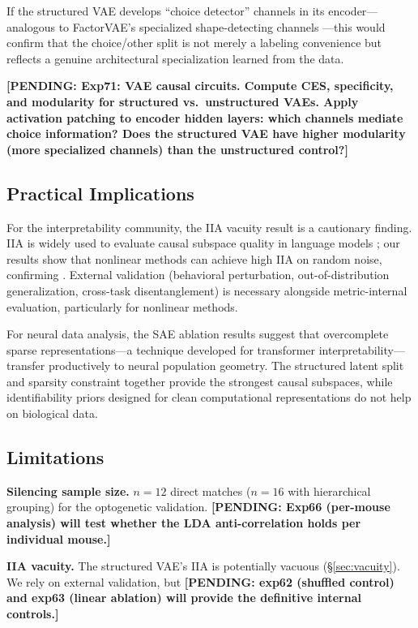 \documentclass{article}
\newcommand{\pending}[1]{\textcolor{red!70!black}{\textbf{[PENDING: #1]}}}
\begin{document}
If the structured VAE develops ``choice detector'' channels in its encoder---analogous to FactorVAE's specialized shape-detecting channels \citep{martinez2025vae_circuits}---this would confirm that the choice/other split is not merely a labeling convenience but reflects a genuine architectural specialization learned from the data.

\pending{Exp71: VAE causal circuits. Compute CES, specificity, and modularity for structured vs.\ unstructured VAEs. Apply activation patching to encoder hidden layers: which channels mediate choice information? Does the structured VAE have higher modularity (more specialized channels) than the unstructured control?}

\subsection{Practical Implications}

For the interpretability community, the IIA vacuity result is a cautionary finding. IIA is widely used to evaluate causal subspace quality in language models \citep{geiger2024finding, geiger2024causal}; our results show that nonlinear methods can achieve high IIA on random noise, confirming \citet{sutter2025iia}. External validation (behavioral perturbation, out-of-distribution generalization, cross-task disentanglement) is necessary alongside metric-internal evaluation, particularly for nonlinear methods.

For neural data analysis, the SAE ablation results suggest that overcomplete sparse representations---a technique developed for transformer interpretability---transfer productively to neural population geometry. The structured latent split and sparsity constraint together provide the strongest causal subspaces, while identifiability priors designed for clean computational representations do not help on biological data.

\subsection{Limitations}

\textbf{Silencing sample size.} $n = 12$ direct matches ($n = 16$ with hierarchical grouping) for the optogenetic validation. \pending{Exp66 (per-mouse analysis) will test whether the LDA anti-correlation holds per individual mouse.}

\textbf{IIA vacuity.} The structured VAE's IIA is potentially vacuous (\S\ref{sec:vacuity}). We rely on external validation, but \pending{exp62 (shuffled control) and exp63 (linear ablation) will provide the definitive internal controls.}
\end{document}
